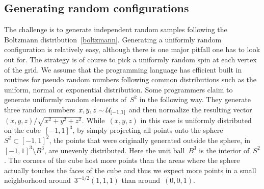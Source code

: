 \subsection{Generating random configurations}\label{subsec:random}

The challenge is to generate independent random samples following the Boltzmann
distribution~\eqref{boltzmann}. Generating a uniformly random configuration is
relatively easy, although there is one major pitfall one has to look out for.
The strategy is of course to pick a uniformly random spin at each vertex of the
grid. We assume that the programming language has efficient built in routines
for pseudo random numbers following common distributions such as the uniform,
normal or exponential distribution. Some programmers claim to generate uniformly
random elements of~$S^2$ in the following way. They generate three random
numbers~$x,y,z \sim \mathcal{U}_{[-1,1]}$ and then normalize the resulting
vector~$(x,y,z) / \sqrt{x^2 + y^2 + z^2}$. While~$(x,y,z)$ in this case is
uniformly distributed on the cube~$[-1,1]^3$, by simply projecting all points
onto the sphere~$S^2 \subset [-1,1]^2$, the points that were originally
generated outside the sphere, \ie{} in~$[-1,1]^3 \setminus B^3$, are unevenly
distributed. Here the unit ball~$B^3$ is the interior of~$S^2$. The corners of
the cube host more points than the areas where the sphere actually touches the
faces of the cube and thus we expect more points in a small neighborhood
around~$3^{-1/2} (1,1,1)$ than around~$(0,0,1)$.

